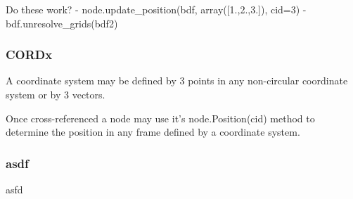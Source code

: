      Do these work?
      - node.update_position(bdf, array([1.,2.,3.]), cid=3) %
      - bdf.unresolve_grids(bdf2) %
      
        
  \subsubsection{CORDx}
     A coordinate system may be defined by 3 points in any non-circular
     coordinate system or by 3 vectors.
     
     Once cross-referenced a node may use it's node.Position(cid) method to
     determine the position in any frame defined by a coordinate system.
  
  \subsubsection{asdf}
     asfd

